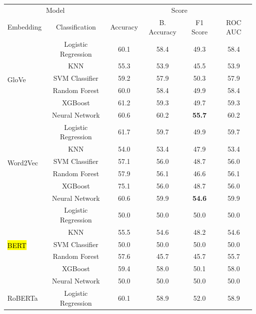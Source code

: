 \begin{table}[htb]
\centering
\begin{tabular}{l|c|c|c|c|c}
\hline


\multicolumn{2}{c|}{Model} & \multicolumn{4}{c}{Score} \\
\cline{1-6}
Embedding & Classification & Accuracy & B. Accuracy & F1 Score & ROC AUC \\

\hline
\multirow{6}{*}{GloVe}
    & Logistic Regression & 60.1 & 58.4 & 49.3 & 58.4 \\
    & KNN & 55.3 & 53.9 & 45.5 & 53.9 \\
    & SVM Classifier & 59.2 & 57.9 & 50.3 & 57.9 \\
    & Random Forest & 60.0 & 58.4 & 49.9 & 58.4 \\
    & XGBoost & 61.2 & 59.3 & 49.7 & 59.3 \\
    & Neural Network & 60.6 & 60.2 & \textbf{55.7} & 60.2 \\
\hline
\multirow{6}{*}{Word2Vec}
    & Logistic Regression & 61.7 & 59.7 & 49.9 & 59.7 \\
    & KNN & 54.0 & 53.4 & 47.9 & 53.4 \\
    & SVM Classifier & 57.1 &  56.0 & 48.7 & 56.0 \\
    & Random Forest & 57.9 & 56.1 & 46.6 & 56.1 \\
    & XGBoost & 75.1 & 56.0 & 48.7 & 56.0 \\
    & Neural Network & 60.6 & 59.9 & \textbf{54.6} & 59.9 \\
\hline
\multirow{6}{*}{\hl{BERT}} 
    & Logistic Regression &       50.0 &       50.0 &                50.0 &      50.0 \\
    & KNN & 55.5 & 54.6 & 48.2 & 54.6 \\
    & SVM Classifier &       50.0 &       50.0 &                50.0  &      50.0  \\
    & Random Forest & 57.6 & 45.7 & 45.7 & 55.7 \\
    & XGBoost & 59.4 & 58.0 & 50.1 & 58.0 \\
    & Neural Network &       50.0  &       50.0  &                50.0 &      50.0 \\
\hline
\multirow{6}{*}{RoBERTa} 
    & Logistic Regression & 60.1 & 58.9 & 52.0 & 58.9 \\

\end{tabular}
\end{table}

